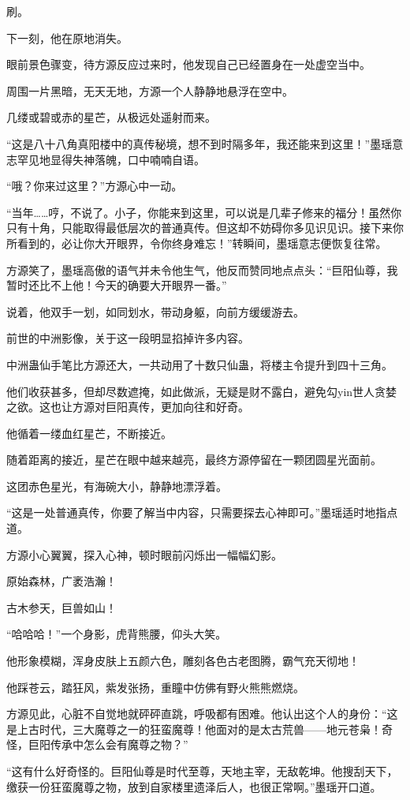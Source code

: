 \begin{this_body}
刷。

下一刻，他在原地消失。

眼前景色骤变，待方源反应过来时，他发现自己已经置身在一处虚空当中。

周围一片黑暗，无天无地，方源一个人静静地悬浮在空中。

几缕或碧或赤的星芒，从极远处遥射而来。

“这是八十八角真阳楼中的真传秘境，想不到时隔多年，我还能来到这里！”墨瑶意志罕见地显得失神落魄，口中喃喃自语。

“哦？你来过这里？”方源心中一动。

“当年……哼，不说了。小子，你能来到这里，可以说是几辈子修来的福分！虽然你只有十角，只能取得最低层次的普通真传。但这却不妨碍你多见识见识。接下来你所看到的，必让你大开眼界，令你终身难忘！”转瞬间，墨瑶意志便恢复往常。

方源笑了，墨瑶高傲的语气并未令他生气，他反而赞同地点点头：“巨阳仙尊，我暂时还比不上他！今天的确要大开眼界一番。”

说着，他双手一划，如同划水，带动身躯，向前方缓缓游去。

前世的中洲影像，关于这一段明显掐掉许多内容。

中洲蛊仙手笔比方源还大，一共动用了十数只仙蛊，将楼主令提升到四十三角。

他们收获甚多，但却尽数遮掩，如此做派，无疑是财不露白，避免勾yin世人贪婪之欲。这也让方源对巨阳真传，更加向往和好奇。

他循着一缕血红星芒，不断接近。

随着距离的接近，星芒在眼中越来越亮，最终方源停留在一颗团圆星光面前。

这团赤色星光，有海碗大小，静静地漂浮着。

“这是一处普通真传，你要了解当中内容，只需要探去心神即可。”墨瑶适时地指点道。

方源小心翼翼，探入心神，顿时眼前闪烁出一幅幅幻影。

原始森林，广袤浩瀚！

古木参天，巨兽如山！

“哈哈哈！”一个身影，虎背熊腰，仰头大笑。

他形象模糊，浑身皮肤上五颜六色，雕刻各色古老图腾，霸气充天彻地！

他踩苍云，踏狂风，紫发张扬，重瞳中仿佛有野火熊熊燃烧。

方源见此，心脏不自觉地就砰砰直跳，呼吸都有困难。他认出这个人的身份：“这是上古时代，三大魔尊之一的狂蛮魔尊！他面对的是太古荒兽——地元苍枭！奇怪，巨阳传承中怎么会有魔尊之物？”

“这有什么好奇怪的。巨阳仙尊是时代至尊，天地主宰，无敌乾坤。他搜刮天下，缴获一份狂蛮魔尊之物，放到自家楼里遗泽后人，也很正常啊。”墨瑶开口道。


\end{this_body}
